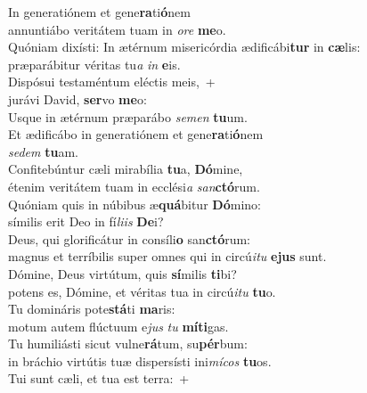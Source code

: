 \evenverse In generatiónem et gene\textbf{ra}ti\textbf{ó}nem~\*\\
\evenverse annuntiábo veritátem tuam in \textit{o}\textit{re} \textbf{me}o.\\
\oddverse Quóniam dixísti: In ætérnum misericórdia ædificábi\textbf{tur} in \textbf{cæ}lis:~\*\\
\oddverse præparábitur véritas tu\textit{a} \textit{in} \textbf{e}is.\\
\evenverse Dispósui testaméntum eléctis meis,~+\\
\evenverse  jurávi David, \textbf{ser}vo \textbf{me}o:~\*\\
\evenverse Usque in ætérnum præparábo \textit{se}\textit{men} \textbf{tu}um.\\
\oddverse Et ædificábo in generatiónem et gene\textbf{ra}ti\textbf{ó}nem~\*\\
\oddverse \textit{se}\textit{dem} \textbf{tu}am.\\
\evenverse Confitebúntur cæli mirabília \textbf{tu}a, \textbf{Dó}mine,~\*\\
\evenverse étenim veritátem tuam in ecclési\textit{a} \textit{san}\textbf{ctó}rum.\\
\oddverse Quóniam quis in núbibus æ\textbf{quá}bitur \textbf{Dó}mino:~\*\\
\oddverse símilis erit Deo in fí\textit{li}\textit{is} \textbf{De}i?\\
\evenverse Deus, qui glorificátur in consíli\textbf{o} san\textbf{ctó}rum:~\*\\
\evenverse magnus et terríbilis super omnes qui in circú\textit{i}\textit{tu} \textbf{e}\textbf{jus} sunt.\\
\oddverse Dómine, Deus virtútum, quis \textbf{sí}milis \textbf{ti}bi?~\*\\
\oddverse potens es, Dómine, et véritas tua in circú\textit{i}\textit{tu} \textbf{tu}o.\\
\evenverse Tu domináris pote\textbf{stá}ti \textbf{ma}ris:~\*\\
\evenverse motum autem flúctuum e\textit{jus} \textit{tu} \textbf{mí}\textbf{ti}gas.\\
\oddverse Tu humiliásti sicut vulne\textbf{rá}tum, su\textbf{pér}bum:~\*\\
\oddverse in bráchio virtútis tuæ dispersísti ini\textit{mí}\textit{cos} \textbf{tu}os.\\
\evenverse Tui sunt cæli, et tua est terra:~+\\
